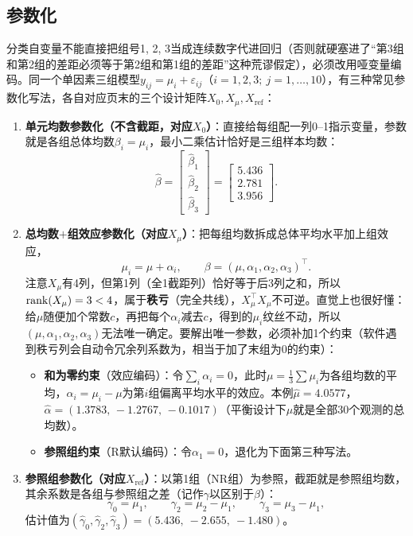 \subsection{参数化}
分类自变量不能直接把组号1, 2, 3当成连续数字代进回归（否则就硬塞进了“第3组和第2组的差距必须等于第2组和第1组的差距”这种荒谬假定），必须改用哑变量编码。同一个单因素三组模型$y_{ij}=\mu_i+\varepsilon_{ij}$（$i=1,2,3;\ j=1,\ldots,10$），有三种常见参数化写法，各自对应页末的三个设计矩阵$X_0,X_\mu,X_{\mathrm{ref}}$：
\begin{enumerate}
\item \textbf{单元均数参数化（不含截距，对应$X_0$）}：直接给每组配一列0--1指示变量，参数就是各组总体均数$\beta_i=\mu_i$，最小二乘估计恰好是三组样本均数：
\[
\widehat\beta=\begin{bmatrix}\widehat\beta_1\\\widehat\beta_2\\\widehat\beta_3\end{bmatrix}
=\begin{bmatrix}5.436\\2.781\\3.956\end{bmatrix}.
\]
\item \textbf{总均数$+$组效应参数化（对应$X_\mu$）}：把每组均数拆成总体平均水平加上组效应，
\[
\mu_i=\mu+\alpha_i,\qquad \beta=(\mu,\alpha_1,\alpha_2,\alpha_3)^\top.
\]
注意$X_\mu$有4列，但第1列（全1截距列）恰好等于后3列之和，所以$\operatorname{rank}(X_\mu)=3<4$，属于\textbf{秩亏}（完全共线），$X_\mu^\top X_\mu$不可逆。直觉上也很好懂：给$\mu$随便加个常数$c$，再把每个$\alpha_i$减去$c$，得到的$\mu_i$纹丝不动，所以$(\mu,\alpha_1,\alpha_2,\alpha_3)$无法唯一确定。要解出唯一参数，必须补加1个约束（软件遇到秩亏列会自动令冗余列系数为，相当于加了末组为0的约束）：
\begin{itemize}
\item \textbf{和为零约束}（效应编码）：令$\sum_i\alpha_i=0$，此时$\mu=\frac13\sum\mu_i$为各组均数的平均，$\alpha_i=\mu_i-\mu$为第$i$组偏离平均水平的效应。本例$\widehat\mu=4.0577$，$\widehat\alpha=(1.3783,\,-1.2767,\,-0.1017)$（平衡设计下$\widehat\mu$就是全部30个观测的总均数）。
\item \textbf{参照组约束}（R默认编码）：令$\alpha_1=0$，退化为下面第三种写法。
\end{itemize}
\item \textbf{参照组参数化（对应$X_{\mathrm{ref}}$）}：以第1组（NR组）为参照，截距就是参照组均数，其余系数是各组与参照组之差（记作$\gamma$以区别于$\beta$）：
\[
\gamma_0=\mu_1,\qquad
\gamma_2=\mu_2-\mu_1,\qquad
\gamma_3=\mu_3-\mu_1,
\]
估计值为$(\widehat\gamma_0,\widehat\gamma_2,\widehat\gamma_3)=(5.436,\ -2.655,\ -1.480)$。
\end{enumerate}

